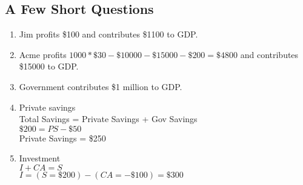 \documentclass{pset}
\begin{document}
\subsection{A Few Short Questions}
\begin{enumerate}
\item Jim profits \$100 and contributes \$1100 to GDP.\@
\item Acme profits \( 1000*\$30-\$10000-\$15000-\$200 = \$4800\) and contributes \$15000 to GDP.\@
\item Government contributes \$1 million to GDP.\@
\item Private savings {\color{red}
    \\Total Savings = Private Savings + Gov Savings
    \\\( \$200 = PS - \$50 \)
    \\Private Savings = \$250
    }
  \item Investment {\color{red}
      \\\( I + CA = S\)
      \\\( I = (S = \$200) - (CA = -\$100) = \$300 \)
      }
\end{enumerate}
\end{document}
